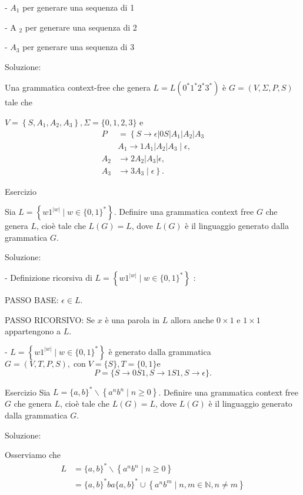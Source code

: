 - $A_{1}$ per generare una sequenza di 1

- A $_{2}$ per generare una sequenza di 2

- $A_{3}$ per generare una sequenza di 3

Soluzione:

Una grammatica context-free che genera $L=L\left(0^{*} 1^{*} 2^{*} 3^{*}\right)$ è $G=(V, \Sigma, P, S)$ tale che 

$V=\left\{S, A_{1}, A_{2}, A_{3}\right\}, \Sigma=\{0,1,2,3\}$ e
$$
\begin{aligned}
P &=\left\{S \rightarrow \epsilon|0 S| A_{1}\left|A_{2}\right| A_{3}\right.\\
& A_{1} \rightarrow 1 A_{1}\left|A_{2}\right| A_{3} \mid \epsilon, \\
A_{2} & \rightarrow 2 A_{2}\left|A_{3}\right| \epsilon, \\
A_{3} &\left.\rightarrow 3 A_{3} \mid \epsilon\right\} .
\end{aligned}
$$

Esercizio

Sia $L=\left\{w 1^{|w|} \mid w \in\{0,1\}^{*}\right\} .$ Definire una grammatica context free $G$ che genera $L$, cioè tale che $L(G)=L$, dove $L(G)$ è il linguaggio generato dalla grammatica $G$.

Soluzione:

- Definizione ricorsiva di $L=\left\{w 1^{|w|} \mid w \in\{0,1\}^{*}\right\}$ :

PASSO BASE: $\epsilon \in L$.

PASSO RICORSIVO: Se $x$ è una parola in $L$ allora anche $0 \times 1$ e $1 \times 1$ appartengono a $L$.

- $L=\left\{w 1^{|w|} \mid w \in\{0,1\}^{*}\right\}$ è generato dalla grammatica $G=(V, T, P, S), \operatorname{con} V=\{S\}, T=\{0,1\} \mathrm{e}$
$$
P=\{S \rightarrow 0 S 1, S \rightarrow 1 S 1, S \rightarrow \epsilon\} .
$$

\vspace{5mm}

Esercizio
Sia $L=\{a, b\}^{*} \backslash\left\{a^{n} b^{n} \mid n \geq 0\right\}$. Definire una grammatica context free $G$ che genera $L$, cioè tale che $L(G)=L$, dove $L(G)$ è il linguaggio generato dalla grammatica $G$.

Soluzione:

Osserviamo che
$$
\begin{aligned}
L &=\{a, b\}^{*} \backslash\left\{a^{n} b^{n} \mid n \geq 0\right\} \\
&=\{a, b\}^{*} b a\{a, b\}^{*} \cup\left\{a^{n} b^{m} \mid n, m \in \mathbb{N}, n \neq m\right\}
\end{aligned}
$$

